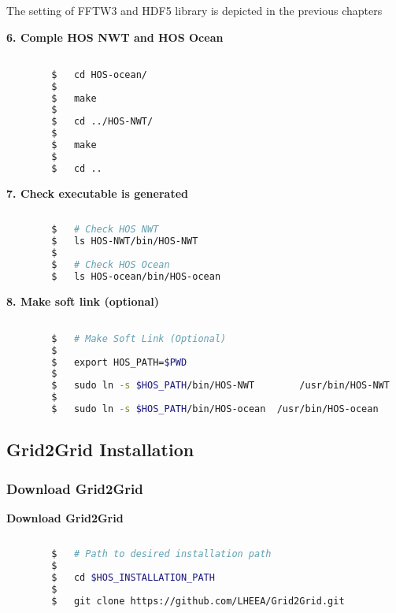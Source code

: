 		The setting of FFTW3 and HDF5 library is depicted in the previous chapters
		
		\pagebreak
		
		\vspace{0.2cm}
		\textbf{6. Comple HOS NWT and HOS Ocean}
		
		\begin{lstlisting}[language=bash]

		$	cd HOS-ocean/
		$
		$	make
		$	
		$	cd ../HOS-NWT/
		$
		$	make
		$
		$	cd ..		
		\end{lstlisting}
		
		\vspace{0.2cm}
		\textbf{7. Check executable is generated}
		
		\begin{lstlisting}[language=bash]
		
		$	# Check HOS NWT
		$	ls HOS-NWT/bin/HOS-NWT
		$
		$	# Check HOS Ocean
		$	ls HOS-ocean/bin/HOS-ocean
		\end{lstlisting}
		
		\vspace{0.2cm}
		\textbf{8. Make soft link (optional)}
		
		\begin{lstlisting}[language=bash]

		$	# Make Soft Link (Optional)
		$
		$	export HOS_PATH=$PWD
		$
		$	sudo ln -s $HOS_PATH/bin/HOS-NWT		/usr/bin/HOS-NWT
		$
		$	sudo ln -s $HOS_PATH/bin/HOS-ocean	/usr/bin/HOS-ocean
		\end{lstlisting}

		\pagebreak
		\subsection{Grid2Grid Installation}
		
		\label{chap:Grid2GridInstall}
		
		\subsubsection{Download Grid2Grid}
		
		\textbf{Download Grid2Grid}
		
		\begin{lstlisting}[language=bash]
		
		$	# Path to desired installation path
		$
		$	cd $HOS_INSTALLATION_PATH
		$
		$	git clone https://github.com/LHEEA/Grid2Grid.git
		\end{lstlisting}
		
